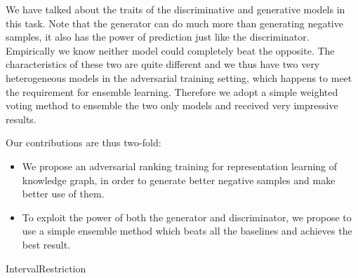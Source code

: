 \documentclass[twocolumn,a4paper,10pt,preprint,3p]{elsarticle}
\begin{document}
We have talked about the traits of the discriminative and generative models in this task. Note that the generator can do much more than generating negative samples, it also has the power of prediction just like the discriminator. Empirically we know neither model could completely beat the opposite. The characteristics of these two are quite different and we thus have two very heterogeneous models in the adversarial training setting, which happens to meet the requirement for ensemble learning. Therefore we adopt a simple weighted voting method to ensemble the two only models and received very impressive results.

Our contributions are thus two-fold:
\begin{itemize}
    \item We propose an adversarial ranking training for representation learning of knowledge graph, in order to generate better negative samples and make better use of them.
    \item To exploit the power of both the generator and discriminator, we propose to use a simple ensemble method which beats all the baselines and achieves the best result.
\end{itemize}




\begin{algorithm*}[t]
\DontPrintSemicolon
{}
    \caption{IntervalRestriction\label{IR}}
\end{algorithm*}
\end{document}
